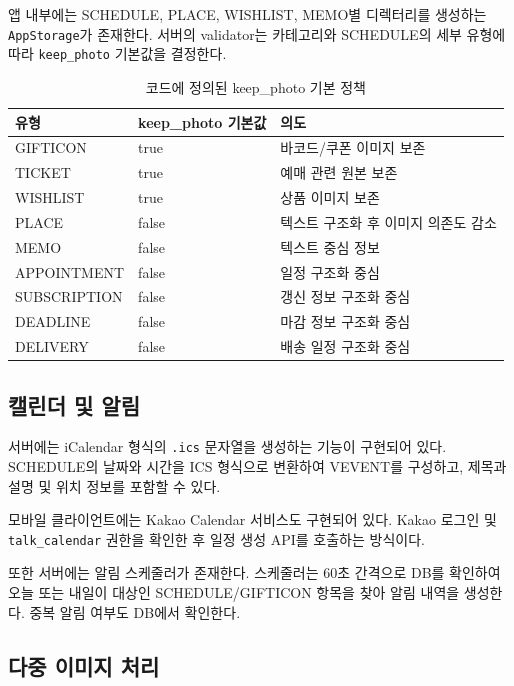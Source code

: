 \documentclass[11pt,a4paper]{article}
\begin{document}
앱 내부에는 SCHEDULE, PLACE, WISHLIST, MEMO별 디렉터리를 생성하는 \texttt{AppStorage}가 존재한다. 서버의 validator는 카테고리와 SCHEDULE의 세부 유형에 따라 \texttt{keep\_photo} 기본값을 결정한다.

\begin{table}[H]
\centering
\small
\begin{tabularx}{0.9\linewidth}{l l l}
\toprule
\textbf{유형} & \textbf{keep\_photo 기본값} & \textbf{의도}\\
\midrule
GIFTICON & true & 바코드/쿠폰 이미지 보존\\
TICKET & true & 예매 관련 원본 보존\\
WISHLIST & true & 상품 이미지 보존\\
PLACE & false & 텍스트 구조화 후 이미지 의존도 감소\\
MEMO & false & 텍스트 중심 정보\\
APPOINTMENT & false & 일정 구조화 중심\\
SUBSCRIPTION & false & 갱신 정보 구조화 중심\\
DEADLINE & false & 마감 정보 구조화 중심\\
DELIVERY & false & 배송 일정 구조화 중심\\
\bottomrule
\end{tabularx}
\caption{코드에 정의된 keep\_photo 기본 정책}
\end{table}



\subsection{캘린더 및 알림}

서버에는 iCalendar 형식의 \texttt{.ics} 문자열을 생성하는 기능이 구현되어 있다. SCHEDULE의 날짜와 시간을 ICS 형식으로 변환하여 VEVENT를 구성하고, 제목과 설명 및 위치 정보를 포함할 수 있다.

모바일 클라이언트에는 Kakao Calendar 서비스도 구현되어 있다. Kakao 로그인 및 \texttt{talk\_calendar} 권한을 확인한 후 일정 생성 API를 호출하는 방식이다.

또한 서버에는 알림 스케줄러가 존재한다. 스케줄러는 60초 간격으로 DB를 확인하여 오늘 또는 내일이 대상인 SCHEDULE/GIFTICON 항목을 찾아 알림 내역을 생성한다. 중복 알림 여부도 DB에서 확인한다.

\subsection{다중 이미지 처리}
\end{document}
